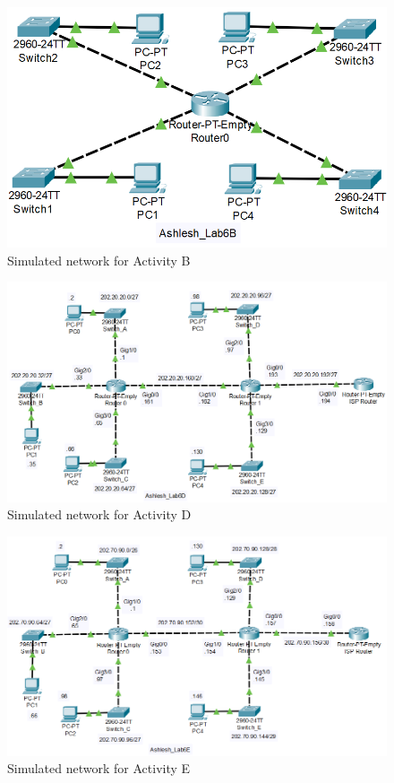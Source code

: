\documentclass{lab_sheet}
\begin{document}
    \begin{figure}[H]
      \centering
      \includegraphics[scale=.5]{Figures/activityb.png}
      \caption{Simulated network for Activity B}
      \label{fig:activityb}
  \end{figure}

  \begin{figure}[H]
    \centering
    \includegraphics[scale=.7]{Figures/activityd.png}
    \caption{Simulated network for Activity D}
    \label{fig:activityd}
\end{figure}

\begin{figure}[H]
    \centering
    \includegraphics[scale=.75]{Figures/activitye.png}
    \caption{Simulated network for Activity E}
    \label{fig:activitye}
\end{figure}
\end{document}
